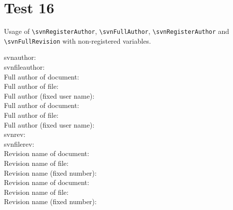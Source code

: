 \documentclass[12pt]{report}
\begin{document}
\chapter{Test 16}
Usage of \verb+\svnRegisterAuthor+, \verb+\svnFullAuthor+,
\verb+\svnRegisterAuthor+ and \verb+\svnFullRevision+ with non-registered
variables.

\noindent
svnauthor: \svnauthor\\
svnfileauthor: \svnfileauthor\\

\noindent
Full author of document: \svnFullAuthor{\svnauthor}\\
Full author of file: \svnFullAuthor{\svnfileauthor}\\
Full author (fixed user name): \\

\noindent
Full author of document: \svnFullAuthor*{\svnauthor}\\
Full author of file: \svnFullAuthor*{\svnfileauthor}\\
Full author (fixed user name): \\

\noindent
svnrev: \svnrev\\
svnfilerev: \svnfilerev\\

\noindent
Revision name of document: \svnFullRevision{\svnrev}\\
Revision name of file: \svnFullRevision{\svnfilerev}\\
Revision name (fixed number): \\

\noindent
Revision name of document: \svnFullRevision*{\svnrev}\\
Revision name of file: \svnFullRevision*{\svnfilerev}\\
Revision name (fixed number): \\
\end{document}
